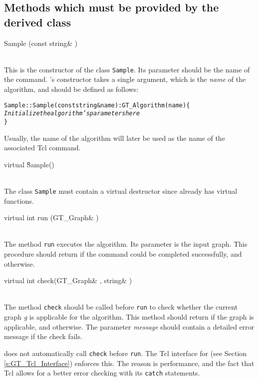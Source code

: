 \documentclass[twoside,fleqn]{report}
\begin{document}
%
%

\subsection{Methods which must be provided by the derived class}

\begin{Cdefinition}

  \item[Sample (const string\& \Param{name})] \strut\\
  This is the constructor of the class \texttt{Sample}.  Its parameter 
  should be the name of the command.  's constructor 
  takes a single argument, which is the \emph{name} of the algorithm, 
  and should be defined as follows:

\begin{alltt}
Sample::Sample(const string& name) : GT_Algorithm (name) \{
    \textnormal{\emph{Initialize the algorithm's parameters here}}
\}
\end{alltt}

  Usually, the name of the algorithm will later be used as the
  name of the associated Tcl command.

  \item[virtual \~ Sample()] \strut\\
  The class \texttt{Sample} must contain a virtual destructor since 
   already has virtual functions.
  
  \item[virtual int run (GT\_Graph\& \Param{g})] \strut\\
  The method \texttt{run} executes the algorithm.  Its parameter is 
  the input graph.  This procedure should return  if the 
  command could be completed successfully, and  otherwise.
  
  \item[virtual int check(GT\_Graph\& \Param{g}, string\& \Param{message})]
  \strut\\
  The method \texttt{check} should be called before \texttt{run} to 
  check whether the current graph \emph{g} is applicable for the 
  algorithm.  This method should return  if the graph is 
  applicable, and  otherwise.  The parameter \emph{message} 
  should contain a detailed error message if the check fails.

   does not automatically call \texttt{check}
  before \texttt{run}. The Tcl interface for  (see
  Section \ref{s:GT_Tcl_Interface}) enforces this. The reason is
  performance, and the fact that Tcl allows for a better error
  checking with its \texttt{catch} statements.
  
\end{Cdefinition}
\end{document}
